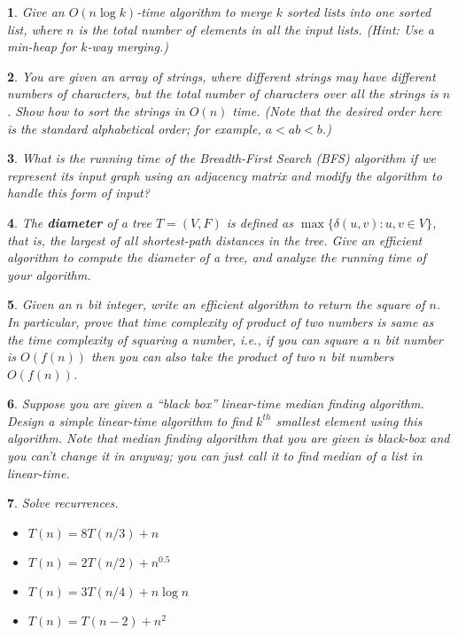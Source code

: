 \documentclass[%
addpoints]{exam}
\theoremstyle{problem}
\newtheorem{p}{}
\begin{document}
\begin{p}
Give an \( O(n \log k) \)-time algorithm to merge \( k \) sorted lists into one sorted list,  
where \( n \) is the total number of elements in all the input lists. (Hint: Use a min-heap for \( k \)-way merging.)
\hfill \end{p}

\begin{p}
You are given an array of strings, where different strings may have different  
numbers of characters, but the total number of characters over all the strings  
is \( n \). Show how to sort the strings in \( O(n) \) time.  
(Note that the desired order here is the standard alphabetical order; for example,  
\( a < ab < b \).)
\hfill \end{p}

\begin{p}
What is the running time of the Breadth-First Search (BFS) algorithm if we represent its input graph using an adjacency matrix and modify the algorithm to handle this form of input?
\hfill \end{p}

\begin{p}
The \textbf{diameter} of a tree \( T = (V, F) \) is defined as \( \max \{ \delta(u, v) : u, v \in V \} \), that is, the largest of all shortest-path distances in the tree. Give an efficient algorithm to compute the diameter of a tree, and analyze the running time of your algorithm.
\hfill \end{p}

\begin{p}
Given an $n$ bit integer, write an efficient algorithm to return the square of $n$. In particular, prove that time complexity of product of two numbers is same as the time complexity of squaring a number, i.e., if you can square a $n$ bit number is $ O(f(n) )$ then you can also take the product of two $n$ bit numbers $ O(f(n) )$.
\hfill \end{p}

\begin{p}
Suppose you are given a ``black box'' linear-time median finding algorithm. Design a simple linear-time algorithm to find $k^{th}$ smallest element using this algorithm. Note that median finding algorithm that you are given is black-box and you can't change it in anyway; you can just call it to find median of a list in linear-time.
\hfill \end{p}

\begin{p}
Solve recurrences.
\hfill \end{p}
\begin{itemize}
			\item $T(n) = 8T(n/3) + n$
			\item $T(n) = 2T(n/2) + n^{0.5}$
			\item $T(n) = 3T(n/4) + n\log n$
			\item $T(n) = T(n-2) + n^2$
\end{itemize} 
\end{document}
